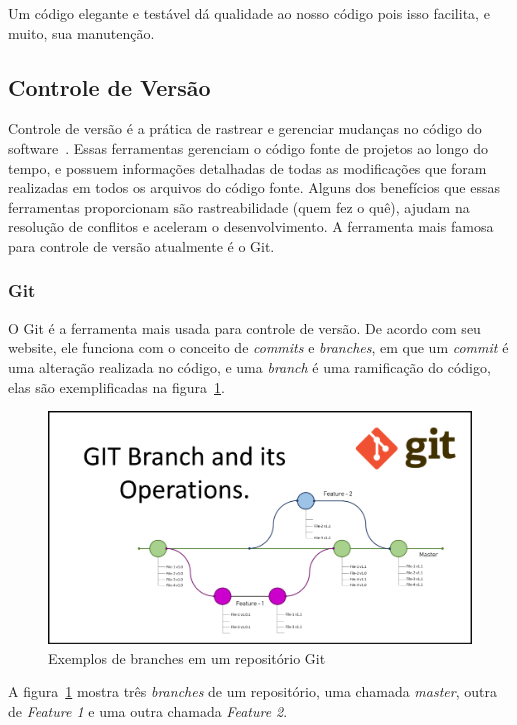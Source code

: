 \documentclass[12pt]{article}
\begin{document}
Um código elegante e testável dá qualidade ao nosso código pois isso facilita, e muito, sua manutenção.

\subsection{Controle de Versão}

Controle de versão é a prática de rastrear e gerenciar mudanças no código do software~\cite{attlasianGit}.
Essas ferramentas gerenciam o código fonte de projetos ao longo do tempo, e possuem informações detalhadas
de todas as modificações que foram realizadas em todos os arquivos do código fonte.
Alguns dos benefícios que essas ferramentas proporcionam são rastreabilidade (quem fez o quê),
ajudam na resolução de conflitos e aceleram o desenvolvimento. A ferramenta mais famosa para controle de
versão atualmente é o Git.

\subsubsection{Git}

O Git é a ferramenta mais usada para controle de versão. De acordo com seu website, ele
funciona com o conceito de \textit{commits} e \textit{branches}, em que um \textit{commit}
é uma alteração realizada no código, e uma \textit{branch} é uma ramificação do código, elas são
exemplificadas na figura~\ref{fig:git-branches}.

\begin{figure}[H]
  \centering
  \includegraphics[width=1\textwidth]{git/git-branches.png}
  \caption{Exemplos de branches em um repositório Git}\label{fig:git-branches}
\end{figure}

A figura~\ref{fig:git-branches} mostra três \textit{branches} de um repositório,
uma chamada \textit{master}, outra de \textit{Feature 1} e uma outra chamada \textit{Feature 2}.
\end{document}
